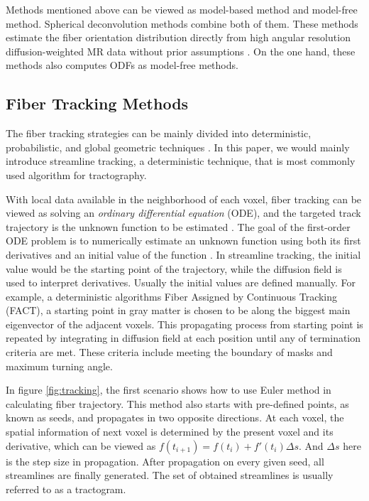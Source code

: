Methods mentioned above can be viewed as model-based method and model-free method. 
Spherical deconvolution methods combine both of them. These methods estimate the fiber orientation distribution directly from high angular resolution diffusion-weighted MR data without prior assumptions \cite*[]{tournierDirectEstimationFiber2004}.
On the one hand, these methods also computes ODFs as model-free methods. 

\subsection{Fiber Tracking Methods}

The fiber tracking strategies can be mainly divided into deterministic, probabilistic, and global geometric techniques \cite*[]{ozarslanAnisotropyFieldsScales2021}.
In this paper, we would mainly introduce streamline tracking, a deterministic technique, that is most commonly used algorithm for tractography.

With local data available in the neighborhood of each voxel, fiber tracking can be viewed as solving an \textit{ordinary differential equation} (ODE), 
and the targeted track trajectory is the unknown function to be estimated \cite*{daducciCOMMITConvexOptimization2015}\cite*{yehTractographyMethodsFindings2021}.
The goal of the first-order ODE problem is to numerically estimate an unknown function using both its first derivatives and an initial value of the function \cite*[]{yehTractographyMethodsFindings2021}.
In streamline tracking, the initial value would be the starting point of the trajectory, while the diffusion field is used to interpret derivatives.
Usually the initial values are defined manually. For example, a deterministic algorithms Fiber Assigned by Continuous Tracking (FACT), 
a starting point in gray matter is chosen to be along the biggest main eigenvector of the adjacent voxels. 
This propagating process from starting point is repeated by integrating in diffusion field at each position until any of termination criteria are met. These criteria include
meeting the boundary of masks and maximum turning angle. 

In figure \ref*{fig:tracking}, the first scenario shows how to use Euler method in calculating fiber trajectory. 
This method also starts with pre-defined points, as known as seeds, and propagates in two opposite directions. At each voxel, the spatial 
information of next voxel is determined by the present voxel and its derivative, 
which can be viewed as $f(t_{i+1}) = f(t_{i}) + f'(t_{i})\Delta s$. And $\Delta s$ here is the step size in propagation.
After propagation on every given seed, all streamlines are finally generated.
The set of obtained streamlines is usually referred to as a tractogram.

